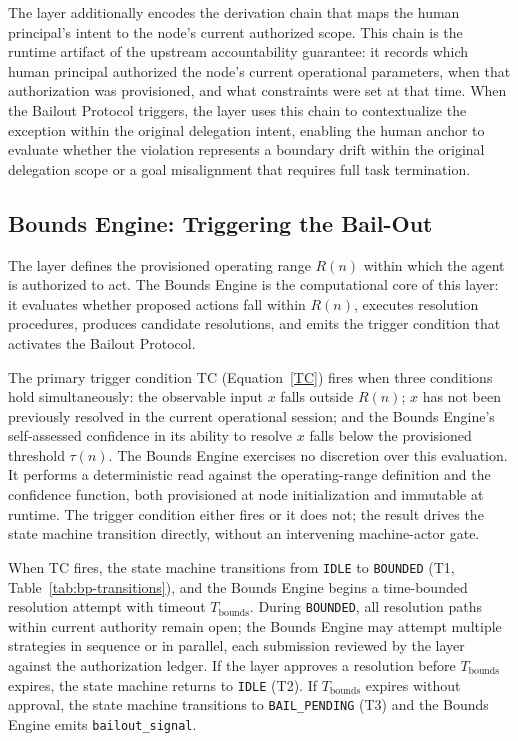 The \purpose{} layer additionally encodes the derivation chain that maps the
human principal's intent to the node's current authorized scope.  This chain
is the runtime artifact of the upstream accountability guarantee: it records
which human principal authorized the node's current operational parameters,
when that authorization was provisioned, and what constraints were set at
that time.  When the Bailout Protocol triggers, the \purpose{} layer uses this
chain to contextualize the exception within the original delegation intent,
enabling the human anchor to evaluate whether the violation represents a
boundary drift within the original delegation scope or a goal misalignment
that requires full task termination.

\subsection{Bounds Engine: Triggering the Bail-Out}
\label{sec:bailout-bounds-engine}

The \bounds{} layer defines the provisioned operating range $R(n)$ within
which the agent is authorized to act.  The Bounds Engine is the computational
core of this layer: it evaluates whether proposed actions fall within $R(n)$,
executes resolution procedures, produces candidate resolutions, and emits the
trigger condition that activates the Bailout Protocol.

The primary trigger condition TC (Equation~\ref{TC}) fires when three
conditions hold simultaneously: the observable input $x$ falls outside $R(n)$;
$x$ has not been previously resolved in the current operational session; and
the Bounds Engine's self-assessed confidence in its ability to resolve $x$
falls below the provisioned threshold $\tau(n)$.  The Bounds Engine exercises
no discretion over this evaluation.  It performs a deterministic read against
the operating-range definition and the confidence function, both provisioned at
node initialization and immutable at runtime.  The trigger condition either
fires or it does not; the result drives the state machine transition directly,
without an intervening machine-actor gate.

When TC fires, the state machine transitions from \texttt{IDLE} to
\texttt{BOUNDED} (T1, Table~\ref{tab:bp-transitions}), and the Bounds Engine
begins a time-bounded resolution attempt with timeout $T_{\text{bounds}}$.
During \texttt{BOUNDED}, all resolution paths within current authority remain
open; the Bounds Engine may attempt multiple strategies in sequence or in
parallel, each submission reviewed by the \fact{} layer against the
authorization ledger.  If the \fact{} layer approves a resolution before
$T_{\text{bounds}}$ expires, the state machine returns to \texttt{IDLE} (T2).
If $T_{\text{bounds}}$ expires without approval, the state machine transitions
to \texttt{BAIL\_PENDING} (T3) and the Bounds Engine emits
\texttt{bailout\_signal}.

